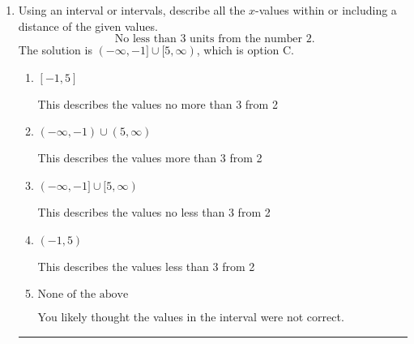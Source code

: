 \documentclass{extbook}[14pt]
\newcommand{\litem}[1]{\item #1

\rule{\textwidth}{0.4pt}}
\begin{document}
\begin{enumerate}
{\begin{enumerate}[label=\Alph*.]
 $(-\infty, -1.5)$, which corresponds to switching the direction of the interval. You likely did this if you did not flip the inequality when dividing by a negative!
\item \( (a, \infty), \text{ where } a \in [-0.9, 2.1] \)

 $(1.5, \infty)$, which corresponds to negating the endpoint of the solution.
\item \( (a, \infty), \text{ where } a \in [-2.4, -0.3] \)

* $(-1.5, \infty)$, which is the correct option.
\item \( (-\infty, a), \text{ where } a \in [0.5, 5.5] \)

 $(-\infty, 1.5)$, which corresponds to switching the direction of the interval AND negating the endpoint. You likely did this if you did not flip the inequality when dividing by a negative as well as not moving values over to a side properly.
\item \( \text{None of the above}. \)

You may have chosen this if you thought the inequality did not match the ends of the intervals.
\end{enumerate}

\textbf{General Comment:} Remember that less/greater than or equal to includes the endpoint, while less/greater do not. Also, remember that you need to flip the inequality when you multiply or divide by a negative.
}
\litem{
Using an interval or intervals, describe all the $x$-values within or including a distance of the given values.
\[ \text{ No less than } 3 \text{ units from the number } 2. \]
The solution is \( (-\infty, -1] \cup [5, \infty) \), which is option C.\begin{enumerate}[label=\Alph*.]
\item \( [-1, 5] \)

This describes the values no more than 3 from 2
\item \( (-\infty, -1) \cup (5, \infty) \)

This describes the values more than 3 from 2
\item \( (-\infty, -1] \cup [5, \infty) \)

This describes the values no less than 3 from 2
\item \( (-1, 5) \)

This describes the values less than 3 from 2
\item \( \text{None of the above} \)

You likely thought the values in the interval were not correct.
\end{enumerate}

}
\end{enumerate}
\end{document}
